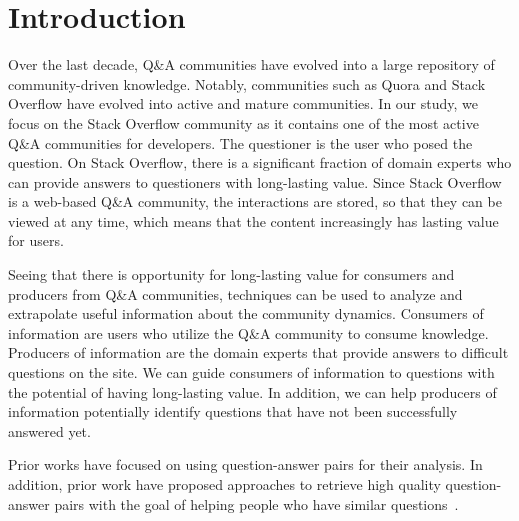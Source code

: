 \section{Introduction} Over the last decade, Q\&A communities have evolved into a large repository of community-driven knowledge. Notably, communities such as Quora and Stack Overflow have evolved into active and mature communities. In our study, we focus on the Stack Overflow community as it contains one of the most active Q\&A communities for developers. The questioner is the user who posed the question. On Stack Overflow, there is a significant fraction of domain experts who can provide answers to questioners with long-lasting value. Since Stack Overflow is a web-based Q\&A community, the interactions are stored, so that they can be viewed at any time, which means that the content increasingly has lasting value for users. 


Seeing that there is opportunity for long-lasting value for consumers and producers from Q\&A communities, techniques can be used to analyze and extrapolate useful information about the community dynamics. Consumers of information are users who utilize the Q\&A community to consume knowledge. Producers of information are the domain experts that provide answers to difficult questions on the site. We can guide consumers of information to questions with the potential of having long-lasting value. In addition, we can help producers of information potentially identify questions that have not been successfully answered yet.


Prior works have focused on using question-answer pairs for their analysis. In addition, prior work have proposed approaches to retrieve high quality question-answer pairs with the goal of helping people who have similar questions~\cite{liu2011predicting}.



